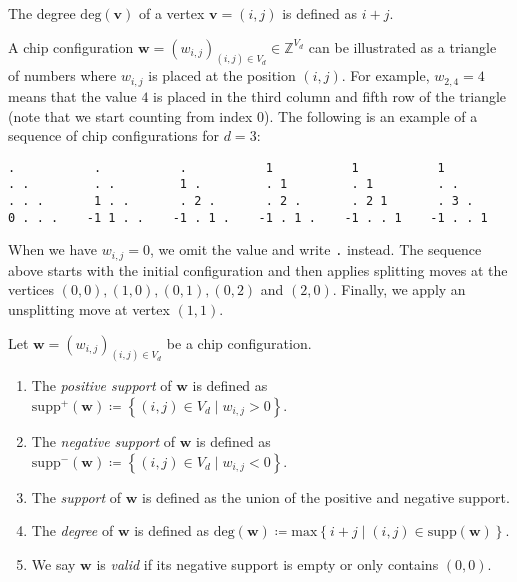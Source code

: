 \begin{definition}
    The degree \( \mathrm{deg}(\mathbf{v}) \) of a vertex \( \mathbf{v} = (i,j) \) is defined as \( i + j \).
\end{definition}

\begin{example}
    A chip configuration \( \mathbf{w} = (w_{i,j})_{(i,j) \in V_d} \in \mathbb{Z}^{V_d} \) can be illustrated as a triangle of numbers where \( w_{i,j} \) is placed at the position \( (i,j) \). For example, \( w_{2,4} = 4 \) means that the value \( 4 \) is placed in the third column and fifth row of the triangle (note that we start counting from index \( 0 \)). The following is an example of a sequence of chip configurations for \( d = 3 \):
    \begin{verbatim}
.           .           .           1           1           1
. .         . .         1 .         . 1         . 1         . .
. . .       1 . .       . 2 .       . 2 .       . 2 1       . 3 .
0 . . .    -1 1 . .    -1 . 1 .    -1 . 1 .    -1 . . 1    -1 . . 1
    \end{verbatim}
    When we have \( w_{i,j} = 0 \), we omit the value and write \texttt{.} instead. The sequence above starts with the initial configuration and then applies splitting moves at the vertices \( (0,0), (1,0), (0,1), (0,2) \) and \( (2,0) \). Finally, we apply an unsplitting move at vertex \( (1,1) \).
\end{example}

\begin{definition}\label{def:chip-terminology}
    Let \( \mathbf{w} = (w_{i,j})_{(i,j) \in V_d} \) be a chip configuration.
    \begin{enumerate}
        \item The \emph{positive support} of \( \mathbf{w} \) is defined as \( \mathrm{supp}^+(\mathbf{w}) \coloneqq \left\{ (i,j) \in V_d\mid w_{i,j} > 0 \right\} \).
        \item The \emph{negative support} of \( \mathbf{w} \) is defined as \( \mathrm{supp}^-(\mathbf{w}) \coloneqq \left\{ (i,j) \in V_d\mid w_{i,j} < 0 \right\} \).
        \item The \emph{support} of \( \mathbf{w} \) is defined as the union of the positive and negative support.
        \item The \emph{degree} of \( \mathbf{w} \) is defined as \( \mathrm{deg}(\mathbf{w}) \coloneqq \mathrm{max}\left\{ i+j \mid (i,j) \in \mathrm{supp}(\mathbf{w}) \right\} \).
        \item We say \( \mathbf{w} \) is \emph{valid} if its negative support is empty or only contains \( (0,0) \).
    \end{enumerate}
\end{definition}

